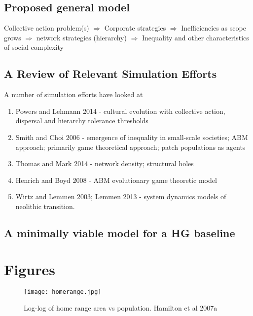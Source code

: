 \documentclass[11pt,oneside,a4paper,onecolumn]{article}
\begin{document}
\subsection{Proposed general model}
Collective action problem(s) $\Rightarrow$ Corporate strategies $\Rightarrow$ Inefficiencies as scope grows $\Rightarrow$ network strategies (hierarchy) $\Rightarrow$ Inequality and other characteristics of social complexity

\subsection{A Review of Relevant Simulation Efforts}

A number of simulation efforts have looked at 
\begin{enumerate}
	\item Powers and Lehmann 2014 - cultural evolution with collective action, dispersal and hierarchy tolerance thresholds
	
	\item Smith and Choi 2006 - emergence of inequality in small-scale societies; ABM approach; primarily game theoretical approach; patch populations as agents
	
	\item Thomas and Mark 2014 - network density; structural holes
	
	\item Henrich and Boyd 2008 - ABM evolutionary game theoretic model
	
	\item Wirtz and Lemmen 2003; Lemmen 2013 - system dynamics models of neolithic transition.
	
\end{enumerate}

\subsection{A minimally viable model for a HG baseline} 

\section{Figures}

\begin{figure}[htp]
 \centering
  \texttt{[image: homerange.jpg]}
\caption[ ]{Log-log of home range area vs population. Hamilton et al 2007a}
 \label{nonlinearhomerange}
\end{figure}
\end{document}
